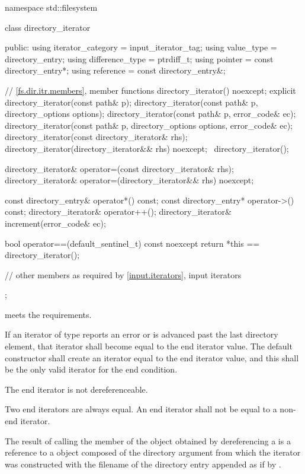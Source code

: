 \begin{codeblock}
namespace std::filesystem {
  class directory_iterator {
  public:
    using iterator_category = input_iterator_tag;
    using value_type        = directory_entry;
    using difference_type   = ptrdiff_t;
    using pointer           = const directory_entry*;
    using reference         = const directory_entry&;

    // \ref{fs.dir.itr.members}, member functions
    directory_iterator() noexcept;
    explicit directory_iterator(const path& p);
    directory_iterator(const path& p, directory_options options);
    directory_iterator(const path& p, error_code& ec);
    directory_iterator(const path& p, directory_options options,
                       error_code& ec);
    directory_iterator(const directory_iterator& rhs);
    directory_iterator(directory_iterator&& rhs) noexcept;
    ~directory_iterator();

    directory_iterator& operator=(const directory_iterator& rhs);
    directory_iterator& operator=(directory_iterator&& rhs) noexcept;

    const directory_entry& operator*() const;
    const directory_entry* operator->() const;
    directory_iterator&    operator++();
    directory_iterator&    increment(error_code& ec);

    bool operator==(default_sentinel_t) const noexcept {
      return *this == directory_iterator();
    }

    // other members as required by \ref{input.iterators}, input iterators
  };
}
\end{codeblock}

\pnum
{} meets the
 requirements.

\pnum
If an iterator of type  reports an error or
is advanced past the last directory element,
that iterator shall become equal to the end iterator
value. The  default constructor shall
create an iterator equal to the end iterator value, and this shall be the only
valid iterator for the end condition.

\pnum
The end iterator is not dereferenceable.

\pnum
Two end iterators are always equal. An end iterator shall not be equal to a non-end
iterator.

\pnum
The result of calling the  member of the  object obtained by dereferencing a  is a reference to a  object composed of the directory argument from which the iterator was
constructed with the filename of the directory entry appended as if by .

